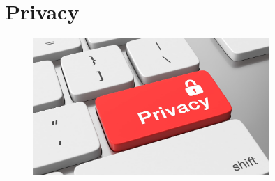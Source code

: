 \chapter{Privacy}
\begin{figure}[h]
\centering
\includegraphics[width=0.8\textwidth]{Capitoli_Report/5.1_Privacy.png}
\caption{\cite{picprivacy}}
\label{fig:privacy}
\end{figure}
\newpage
